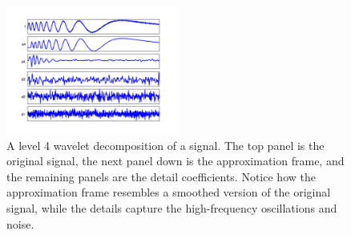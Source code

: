 \begin{figure}
\centering
\includegraphics[width = 0.5\textwidth]{dwt1D}
\caption{A level 4 wavelet decomposition of a signal. The top panel is the original signal,
the next panel down is the approximation frame, and the remaining panels are the detail coefficients.
Notice how the approximation frame resembles a smoothed version of the original signal, while the 
details capture the high-frequency oscillations and noise.}
\label{fig:dwt1D}
\end{figure}

